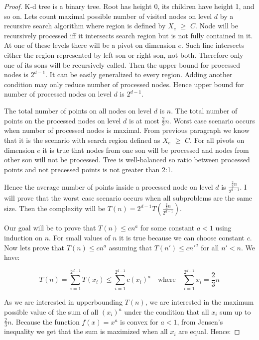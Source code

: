 \documentclass[10pt,a4paper]{article}
\begin{document}
\begin{proof}

K-d tree is a binary tree. Root has height 0, its children have height 1, and so on. Lets count maximal possible number of visited nodes on level $d$ by a recursive search algorithm where region is defined by $X_e$ $\geq$ $C$. Node will be recursively processed iff it intersects search region but is not fully contained in it. At one of these levels there will be a pivot on dimension $e$. Such line intersects either the region represented by left son or right son, not both. Therefore only one of its sons will be recursively called. Then the upper bound for processed nodes is $2^{d-1}$. It can be easily generalized to every region. Adding another condition may only reduce number of processed nodes. Hence upper bound for number of processed nodes on level $d$ is $2^{d-1}$. 

The total number of points on all nodes on level $d$ is $n$. The total number of points on the processed nodes on level $d$ is at most $\frac{2}{3}n$. Worst case scenario occurs when number of processed nodes is maximal. From previous paragraph we know that it is the scenario with search region defined as $X_e$ $\geq$ $C$. For all pivots on dimension $e$ it is true that nodes from one son will be processed and nodes from other son will not be processed. Tree is well-balanced so ratio between processed points and not precessed points is not greater than 2:1.

Hence the average number of points inside a processed node on level $d$ is $\frac{\frac{2}{3}n}{2^{d-1}}$. I will prove that the worst case scenario occurs when all subproblems are the same size. Then the complexity will be $T(n)=2^{d-1}T(\frac{\frac{2}{3}n}{2^{d-1}})$.

Our goal will be to prove that $T(n) \leq c n^a$ for some constant $a < 1$ using induction on $n$. For small values of $n$ it is true because we can choose constant $c$. Now lets prove that $T(n) \leq c n^a$ assuming that $T(n') \leq c n'^a$ for all $n'<n$. We have:

$$T(n) = \displaystyle\sum\limits_{i=1}^{2^{d-1}} T(x_i)\leq\displaystyle\sum\limits_{i=1}^{2^{d-1}} c(x_i)^{a}  \quad\text{where}\quad  \displaystyle\sum\limits_{i=1}^{2^{d-1}} x_i = \frac{2}{3}n$$ 

As we are interested in upperbounding $T(n)$, we are interested in the maximum possible value of the sum of all $(x_i)^{a}$ under the condition that all $x_{i}$ sum up to $\frac{2}{3}n$. Because the function $f(x)=x^{a}$ is convex for $a<1$, from Jensen's inequality we get that the sum is maximized when all $x_{i}$ are equal. Hence:


\end{proof}
\end{document}
